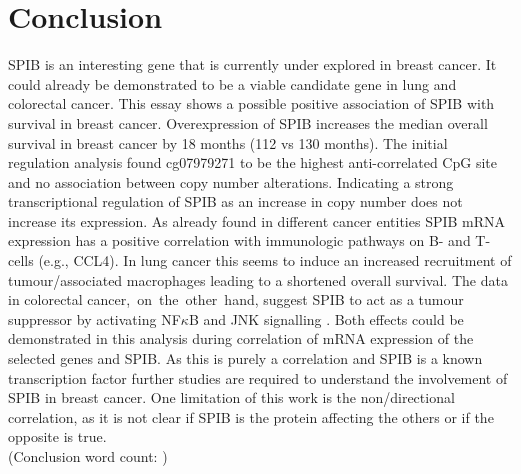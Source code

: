 \section{Conclusion}
\countem

SPIB is an interesting gene that is currently under explored in breast cancer.
It could already be demonstrated to be a viable candidate gene in lung \cite{Huang2021, Zhang2020} and colorectal \cite{Zhao2021} cancer.
This essay shows a possible positive association of SPIB with survival in breast cancer.
Overexpression of SPIB increases the median overall survival in breast cancer by 18 months (112 vs 130 months).
The initial regulation analysis found cg07979271 to be the highest anti-correlated CpG site and no association between copy number alterations.
Indicating a strong transcriptional regulation of SPIB as an increase in copy number does not increase its expression.
As already found in different cancer entities \cite{Huang2021,Zhang2020} SPIB mRNA expression has a positive correlation with immunologic pathways on B- and T-cells (e.g., CCL4).
In lung cancer this seems to induce an increased recruitment of tumour\-/associated macrophages \cite{Huang2021} leading to a shortened overall survival.
The data in colorectal cancer,\ on\ the\ other\ hand, suggest SPIB to act as a tumour suppressor by activating NF$\kappa$B and JNK signalling \cite{Zhang2020}.
Both effects could be demonstrated in this analysis during correlation of mRNA expression of the selected genes and SPIB.
As this is purely a correlation and SPIB is a known transcription factor further studies are required to understand the involvement of SPIB in breast cancer.
One limitation of this work is the non\-/directional correlation, as it is not clear if SPIB is the protein affecting the others or if the opposite is true.
\\
\endcountem 
(Conclusion word count: \thewordcount{})